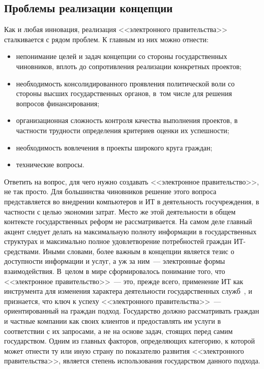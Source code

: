 \begin{multicols}{2}
\subsection{Проблемы реализации концепции} %

Как и любая инновация, реализация <<электронного правительства>> сталкивается с
рядом проблем. К главным из них можно отнести:
\begin{itemize}
\item непонимание целей и задач концепции со стороны государственных чиновников,
вплоть до сопротивления реализации конкретных проектов;
\item необходимость консолидированного проявления политической воли со стороны
высших государственных органов, в~том числе для решения вопросов финансирования;\\[-9pt]
\item организационная сложность контроля качества выполнения проектов, в
частности трудности определения критериев оценки их успешности;\\[-9pt]
\item необходимость вовлечения в проекты широкого круга граждан;\\[-9pt]
\item технические вопросы.\\[-9pt]
\end{itemize}

Ответить на вопрос, для чего нужно создавать <<электронное правительство>>, не так
просто. Для большинства чиновников решение этого вопроса представляется во
внедрении компьютеров и ИТ в деятельность гос\-уч\-реж\-де\-ния, в
частности с \mbox{целью} экономии затрат. Место же этой де\-я\-тель\-ности в общем контексте
государственных реформ не рассматривается. На самом деле главный акцент следует
делать на максимальную полноту информации в государственных структурах и
максимально полное удовлетворение потребностей граждан ИТ-сред\-ст\-ва\-ми. Иными
словами, более важным в концепции является тезис о доступности информации и услуг, а
уж за ним~--- электронные формы взаимодействия. В~целом в мире сформировалось
понимание того, что <<электронное правительство>>~--- это, прежде всего, применение
ИТ как инструмента для изменения характера деятельности
государственных служб~\cite{3bos}, и  признается, что ключ к успеху <<электронного
правительства>>~--- ориентированный на граждан подход. Государство должно
рассматривать граждан и частные компании как своих клиентов и предоставлять им
услуги в соответствии с их запросами, а не на основе задач, стоящих перед самим
государством. Одним из главных факторов, определяющих категорию, к которой может
отнести ту или иную страну по показателю развития <<электронного правительства>>,
является степень использования государством данного подхода.


\end{multicols}
